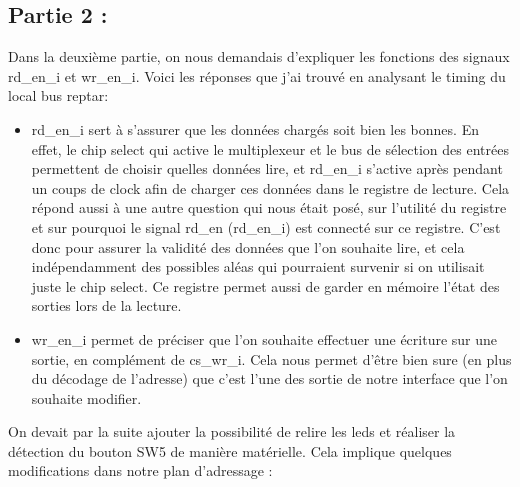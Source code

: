 \subsection*{Partie 2 :}
Dans la deuxième partie, on nous demandais d'expliquer les fonctions des signaux rd\_en\_i et wr\_en\_i. Voici les réponses que j'ai trouvé en analysant le timing du local bus reptar:\\
\begin{itemize}
\item rd\_en\_i sert à s'assurer que les données chargés soit bien les bonnes. En effet, le chip select qui active le multiplexeur et le bus de sélection des entrées permettent de choisir quelles données lire, et rd\_en\_i s'active après pendant un coups de clock afin de charger ces données dans le registre de lecture. Cela répond aussi à une autre question qui nous était posé, sur l'utilité du registre et sur pourquoi le signal rd\_en (rd\_en\_i) est connecté sur ce registre. C'est donc pour assurer la validité des données que l'on souhaite lire, et cela indépendamment des possibles aléas qui pourraient survenir si on utilisait juste le chip select. Ce registre permet aussi de garder en mémoire l'état des sorties lors de la lecture.
\item wr\_en\_i permet de préciser que l'on souhaite effectuer une écriture sur une sortie, en complément de cs\_wr\_i. Cela nous permet d'être bien sure (en plus du décodage de l'adresse) que c'est l'une des sortie de notre interface que l'on souhaite modifier.\\
\end{itemize}\par
On devait par la suite ajouter la possibilité de relire les leds et réaliser la détection du bouton SW5 de manière matérielle. Cela implique quelques modifications dans notre plan d'adressage : \\

